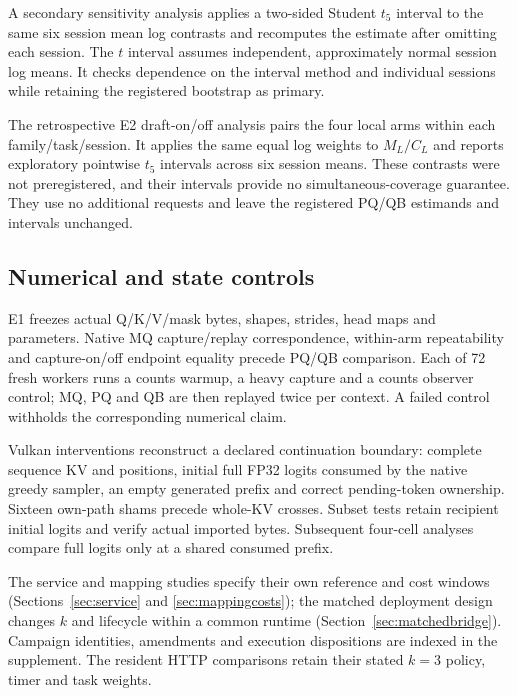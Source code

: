 A secondary sensitivity analysis applies a two-sided Student $t_5$ interval to the same six session mean log contrasts and recomputes the estimate after omitting each session. The $t$ interval assumes independent, approximately normal session log means. It checks dependence on the interval method and individual sessions while retaining the registered bootstrap as primary.

The retrospective E2 draft-on/off analysis pairs the four local arms within each family/task/session. It applies the same equal log weights to $M_L/C_L$ and reports exploratory pointwise $t_5$ intervals across six session means. These contrasts were not preregistered, and their intervals provide no simultaneous-coverage guarantee. They use no additional requests and leave the registered PQ/QB estimands and intervals unchanged.

\subsection{Numerical and state controls}
E1 freezes actual Q/K/V/mask bytes, shapes, strides, head maps and parameters. Native MQ capture/replay correspondence, within-arm repeatability and capture-on/off endpoint equality precede PQ/QB comparison. Each of 72 fresh workers runs a counts warmup, a heavy capture and a counts observer control; MQ, PQ and QB are then replayed twice per context. A failed control withholds the corresponding numerical claim.

Vulkan interventions reconstruct a declared continuation boundary: complete sequence KV and positions, initial full FP32 logits consumed by the native greedy sampler, an empty generated prefix and correct pending-token ownership. Sixteen own-path shams precede whole-KV crosses. Subset tests retain recipient initial logits and verify actual imported bytes. Subsequent four-cell analyses compare full logits only at a shared consumed prefix.

The service and mapping studies specify their own reference and cost windows (Sections~\ref{sec:service} and \ref{sec:mappingcosts}); the matched deployment design changes $k$ and lifecycle within a common runtime (Section~\ref{sec:matchedbridge}). Campaign identities, amendments and execution dispositions are indexed in the supplement. The resident HTTP comparisons retain their stated $k=3$ policy, timer and task weights.
